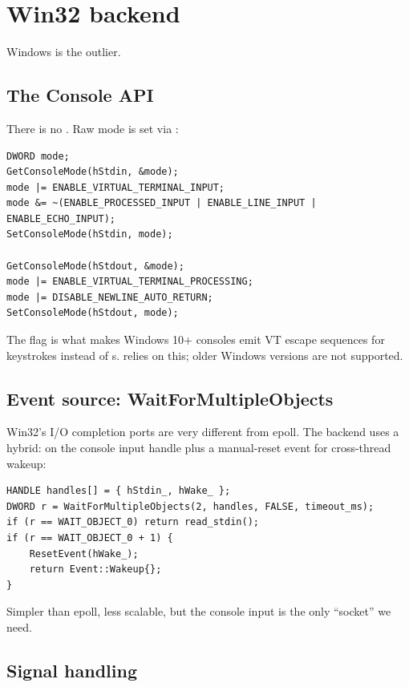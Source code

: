 \section{Win32 backend}

Windows is the outlier.

\subsection*{The Console API}

There is no . Raw mode is set via
:

\begin{lstlisting}
DWORD mode;
GetConsoleMode(hStdin, &mode);
mode |= ENABLE_VIRTUAL_TERMINAL_INPUT;
mode &= ~(ENABLE_PROCESSED_INPUT | ENABLE_LINE_INPUT | ENABLE_ECHO_INPUT);
SetConsoleMode(hStdin, mode);

GetConsoleMode(hStdout, &mode);
mode |= ENABLE_VIRTUAL_TERMINAL_PROCESSING;
mode |= DISABLE_NEWLINE_AUTO_RETURN;
SetConsoleMode(hStdout, mode);
\end{lstlisting}

The  flag is what makes
Windows 10+ consoles emit VT escape sequences for keystrokes
instead of s. \maya{} relies on this; older
Windows versions are not supported.

\subsection*{Event source: WaitForMultipleObjects}

Win32's I/O completion ports are very different from epoll. The
\maya{} backend uses a hybrid:  on
the console input handle plus a manual-reset event for
cross-thread wakeup:

\begin{lstlisting}
HANDLE handles[] = { hStdin_, hWake_ };
DWORD r = WaitForMultipleObjects(2, handles, FALSE, timeout_ms);
if (r == WAIT_OBJECT_0) return read_stdin();
if (r == WAIT_OBJECT_0 + 1) {
    ResetEvent(hWake_);
    return Event::Wakeup{};
}
\end{lstlisting}

Simpler than epoll, less scalable, but the console input is the
only ``socket'' we need.

\subsection*{Signal handling}

